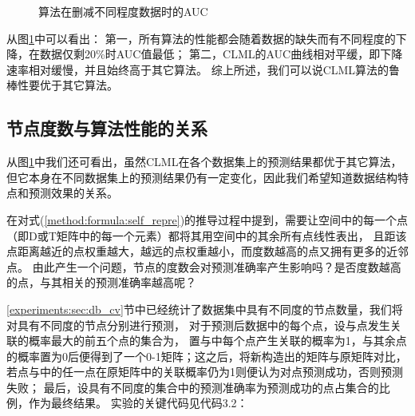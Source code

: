 \begin{figure}
    \centering
    \caption{算法在删减不同程度数据时的AUC}
    \label{experiments:fig:robust}
\end{figure}


从图\ref{experiments:fig:robust}中可以看出：
第一，所有算法的性能都会随着数据的缺失而有不同程度的下降，在数据仅剩20\%时AUC值最低；
第二，CLML的AUC曲线相对平缓，即下降速率相对缓慢，并且始终高于其它算法。
综上所述，我们可以说CLML算法的鲁棒性要优于其它算法。

\subsection{节点度数与算法性能的关系}
从图\ref{experiments:fig:robust}中我们还可看出，虽然CLML在各个数据集上的预测结果都优于其它算法，
但它本身在不同数据集上的预测结果仍有一定变化，因此我们希望知道数据结构特点和预测效果的关系。


在对式(\ref{method:formula:self_repre})的推导过程中提到，需要让空间中的每一个点（即D或T矩阵中的每一个元素）都将其用空间中的其余所有点线性表出，
且距该点距离越近的点权重越大，越远的点权重越小，而度数越高的点又拥有更多的近邻点。
由此产生一个问题，节点的度数会对预测准确率产生影响吗？是否度数越高的点，与其相关的预测准确率越高呢？


\ref{experiments:sec:db_cv}节中已经统计了数据集中具有不同度的节点数量，我们将对具有不同度的节点分别进行预测，
对于预测后数据中的每个点，设与点发生关联的概率最大的前五个点的集合为，
置与中每个点产生关联的概率为1，与其余点的概率置为0后便得到了一个0-1矩阵；这之后，将新构造出的矩阵与原矩阵对比，
若点与中的任一点在原矩阵中的关联概率仍为1则便认为对点预测成功，否则预测失败；
最后，设具有不同度的集合中的预测准确率为预测成功的点占集合的比例，作为最终结果。
实验的关键代码见代码3.2：



